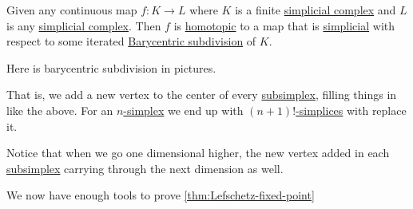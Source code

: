 \begin{theorem}\label{thm:simplicial-approximation-theorem}
	Given any continuous map \(f \colon K \to L\) where \(K\) is a finite \hyperref[def:simplicial-complex]{simplicial complex} and
	\(L\) is any \hyperref[def:simplicial-complex]{simplicial complex}. Then \(f\) is \hyperref[def:homotopic]{homotopic} to a map
	that is \hyperref[def:simplicial-map]{simplicial} with respect to some iterated \hyperref[eg:Barycentric-subdivision]{Barycentric subdivision} of \(K\).
\end{theorem}
\begin{eg}\label{eg:Barycentric-subdivision}
	Here is barycentric subdivision in pictures.
	\begin{figure}[H]
		\centering
		\label{fig:eg:barycentric-subdivision}
	\end{figure}
	That is, we add a new vertex to the center of every \hyperref[def:subsimplex]{subsimplex}, filling things in like the above.
	For an \hyperref[def:standard-simplex]{\(n\)-simplex} we end up with \hyperref[def:standard-simplex]{\((n + 1)!\)-simplices} with replace it.
	\begin{note}
		Notice that when we go one dimensional higher, the new vertex added in each \hyperref[def:subsimplex]{subsimplex} carrying through the next
		dimension as well.
	\end{note}
\end{eg}

We now have enough tools to prove \autoref{thm:Lefschetz-fixed-point}

